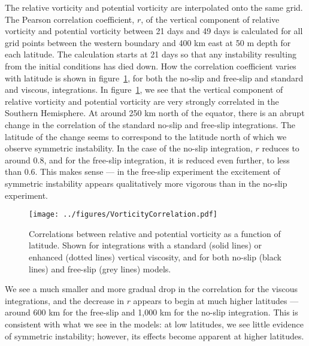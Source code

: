 The relative vorticity and potential vorticity are interpolated onto the same grid. The Pearson correlation coefficient, $r$, of the vertical component of relative vorticity and potential vorticity between 21 days and 49 days is calculated for all grid points between the western boundary and 400 km east at 50 m depth for each latitude. The calculation starts at 21 days so that any instability resulting from the initial conditions has died down. How the correlation coefficient varies with latitude is shown in figure~\ref{fig:VorticityCorrelations}, for both the no-slip and free-slip and standard and viscous, integrations.
In figure~\ref{fig:VorticityCorrelations}, we see that the vertical component of relative vorticity and potential vorticity are very strongly correlated in the Southern Hemisphere. At around 250 km north of the equator, there is an abrupt change in the correlation of the standard no-slip and free-slip integrations. The latitude of the change seems to correspond to the latitude north of which we observe symmetric instability. In the case of the no-slip integration, $r$ reduces to around 0.8, and for the free-slip integration, it is reduced even further, to less than 0.6. This makes sense --- in the free-slip experiment the excitement of symmetric instability appears qualitatively more vigorous than in the no-slip experiment.

\begin{figure} 
    \centering
    \texttt{[image: ../figures/VorticityCorrelation.pdf]}
    \caption{Correlations between relative and potential vorticity as a function of latitude. Shown for integrations with a standard (solid lines) or enhanced (dotted lines) vertical viscosity, and for both no-slip (black lines) and free-slip (grey lines) models.}
    \label{fig:VorticityCorrelations}
\end{figure}

We see a much smaller and more gradual drop in the correlation for the viscous integrations, and the decrease in $r$ appears to begin at much higher latitudes --- around 600 km for the free-slip and 1,000 km for the no-slip integration. This is consistent with what we see in the models: at low latitudes, we see little evidence of symmetric instability; however, its effects become apparent at higher latitudes.

